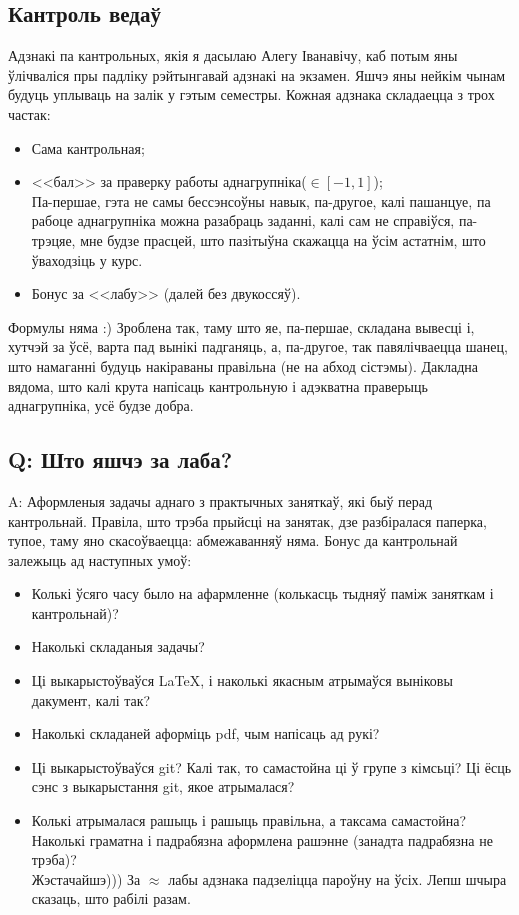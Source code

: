 \documentclass[12pt, a4paper]{extarticle}
\begin{document}
    \subsection{Кантроль ведаў}
    Адзнакі па кантрольных, якія я дасылаю Алегу Іванавічу, каб потым яны ўлічваліся пры падліку рэйтынгавай адзнакі на экзамен. Яшчэ яны нейкім чынам будуць уплываць на залік у гэтым семестры. Кожная адзнака складаецца з трох частак:
    \begin{itemize}
        \item Сама кантрольная;
        \item <<бал>> за праверку работы аднагрупніка($\in [-1, 1]$); \\[6pt]
        {Па-першае, гэта не самы бессэнсоўны навык, па-другое, калі пашанцуе, па рабоце аднагрупніка можна разабраць заданні, калі сам не справіўся, па-трэцяе, мне будзе прасцей, што пазітыўна скажацца на ўсім астатнім, што ўваходзіць у курс.}
        \item Бонус за <<лабу>> (далей без двукоссяў).
    \end{itemize}
    {Формулы няма :) Зроблена так, таму што яе, па-першае, складана вывесці і, хутчэй за ўсё, варта пад вынікі падганяць, а, па-другое, так павялічваецца шанец, што намаганні будуць накіраваны правільна (не на абход сістэмы). Дакладна вядома, што калі крута напісаць кантрольную і адэкватна праверыць аднагрупніка, усё будзе добра.}

    \subsection{Q: Што яшчэ за лаба?}
    {\large A:} Аформленыя задачы аднаго з практычных заняткаў, які быў перад кантрольнай. Правіла, што трэба прыйсці на занятак, дзе разбіралася паперка, тупое, таму яно скасоўваецца: абмежаванняў няма. Бонус да кантрольнай залежыць ад наступных умоў:
    \begin{itemize}
        \item Колькі ўсяго часу было на афармленне (колькасць тыдняў паміж заняткам і кантрольнай)?
        \item Наколькі складаныя задачы?
        \item Ці выкарыстоўваўся \LaTeX, і наколькі якасным атрымаўся выніковы дакумент, калі так?
        \item Наколькі складаней аформіць pdf, чым напісаць ад рукі?
        \item Ці выкарыстоўваўся git? Калі так, то самастойна ці ў групе з кімсьці? Ці ёсць сэнс з выкарыстання git, якое атрымалася?
        \item Колькі атрымалася рашыць і рашыць правільна, а таксама самастойна? Наколькі граматна і падрабязна аформлена рашэнне (занадта падрабязна не трэба)? \\[6pt]
        {Жэстачайшэ))) За $\approx$ лабы адзнака падзеліцца пароўну на ўсіх. Лепш шчыра сказаць, што рабілі разам.}
    \end{itemize}
\end{document}
